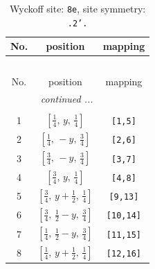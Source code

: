 \documentclass[fleqn,8pt]{jsarticle}
\begin{document}
\begin{longtable}{ccc}
\caption{Wyckoff site: {\tt 8e}, site symmetry: {\tt .2'.}}
 \\
 \hline \hline
No. & position & mapping \\ \hline \endfirsthead

\multicolumn{2}{l}{\tablename\ \thetable{}} \\
 \hline \hline
No. & position & mapping \\ \hline \endhead

 \hline \hline
\multicolumn{2}{r}{\footnotesize\it continued ...} \\ \endfoot

 \hline \hline
\multicolumn{2}{r}{} \\ \endlastfoot

1 & $\left[ \frac{1}{4},\, y,\, \frac{1}{4} \right]$ & {\tt [1,5]} \\ \hline
2 & $\left[ \frac{1}{4},\, - y,\, \frac{3}{4} \right]$ & {\tt [2,6]} \\ \hline
3 & $\left[ \frac{3}{4},\, - y,\, \frac{3}{4} \right]$ & {\tt [3,7]} \\ \hline
4 & $\left[ \frac{3}{4},\, y,\, \frac{1}{4} \right]$ & {\tt [4,8]} \\ \hline
5 & $\left[ \frac{3}{4},\, y + \frac{1}{2},\, \frac{1}{4} \right]$ & {\tt [9,13]} \\ \hline
6 & $\left[ \frac{3}{4},\, \frac{1}{2} - y,\, \frac{3}{4} \right]$ & {\tt [10,14]} \\ \hline
7 & $\left[ \frac{1}{4},\, \frac{1}{2} - y,\, \frac{3}{4} \right]$ & {\tt [11,15]} \\ \hline
8 & $\left[ \frac{1}{4},\, y + \frac{1}{2},\, \frac{1}{4} \right]$ & {\tt [12,16]} \\
\end{longtable}
\renewcommand{\arraystretch}{1.2}
\end{document}
